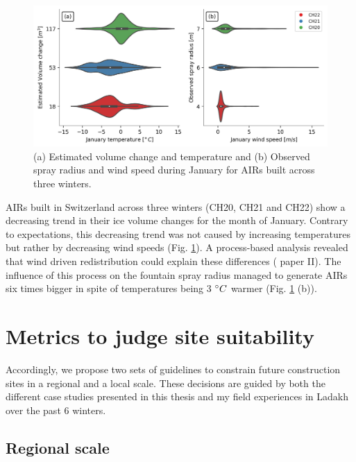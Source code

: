 \begin{figure}[htb]
\centering
\includegraphics[width=\textwidth]{figs/CH_diffs.jpg}
\caption{(a) Estimated volume change and temperature and (b) Observed spray radius and wind speed
during January for AIRs built across three winters. } 
\label{fig:CH_diffs}
\end{figure}

AIRs built in Switzerland across three winters (CH20, CH21 and CH22) show a decreasing trend in their ice volume
changes for the month of January. Contrary to expectations, this decreasing trend was not caused by increasing
temperatures but rather by decreasing wind speeds (Fig. \ref{fig:CH_diffs}). A process-based analysis  revealed
that wind driven redistribution could explain these differences ( paper II). The influence of this process on
the fountain spray radius managed to generate AIRs six times bigger in spite of temperatures being 3 $^{\circ} C$
warmer (Fig. \ref{fig:CH_diffs} (b)). 



\section{Metrics to judge site suitability}

Accordingly, we propose two sets of guidelines to constrain future construction sites in a regional and a local
scale. These decisions are guided by both the different case studies presented in this thesis and my field
experiences in Ladakh over the past 6 winters.

\subsection{Regional scale}


